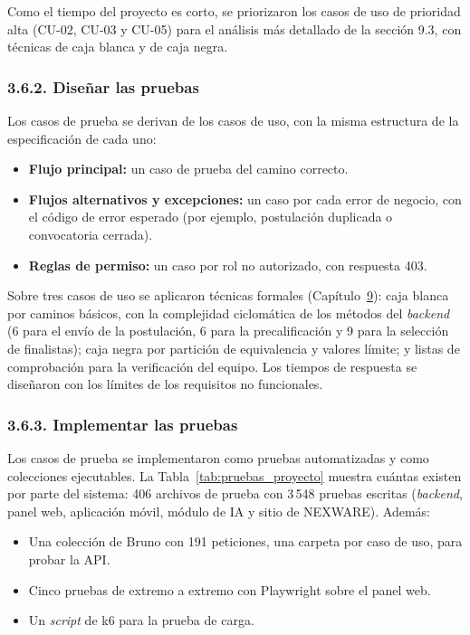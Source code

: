 Como el tiempo del proyecto es corto, se priorizaron los casos de uso de prioridad alta (CU-02, CU-03 y CU-05) para el análisis más detallado de la sección 9.3, con técnicas de caja blanca y de caja negra.

\subsubsection{3.6.2. Diseñar las pruebas}

Los casos de prueba se derivan de los casos de uso, con la misma estructura de la especificación de cada uno:

\begin{itemize}
    \item \textbf{Flujo principal:} un caso de prueba del camino correcto.
    \item \textbf{Flujos alternativos y excepciones:} un caso por cada error de negocio, con el código de error esperado (por ejemplo, postulación duplicada o convocatoria cerrada).
    \item \textbf{Reglas de permiso:} un caso por rol no autorizado, con respuesta 403.
\end{itemize}

Sobre tres casos de uso se aplicaron técnicas formales (Capítulo~\hyperref[cap:pruebas]{9}): caja blanca por caminos básicos, con la complejidad ciclomática de los métodos del \textit{backend} (6 para el envío de la postulación, 6 para la precalificación y 9 para la selección de finalistas); caja negra por partición de equivalencia y valores límite; y listas de comprobación para la verificación del equipo. Los tiempos de respuesta se diseñaron con los límites de los requisitos no funcionales.

\subsubsection{3.6.3. Implementar las pruebas}

Los casos de prueba se implementaron como pruebas automatizadas y como colecciones ejecutables. La Tabla~\ref{tab:pruebas_proyecto} muestra cuántas existen por parte del sistema: 406 archivos de prueba con 3\,548 pruebas escritas (\textit{backend}, panel web, aplicación móvil, módulo de IA y sitio de NEXWARE). Además:

\begin{itemize}
    \item Una colección de Bruno con 191 peticiones, una carpeta por caso de uso, para probar la API.
    \item Cinco pruebas de extremo a extremo con Playwright sobre el panel web.
    \item Un \textit{script} de k6 para la prueba de carga.
\end{itemize}

